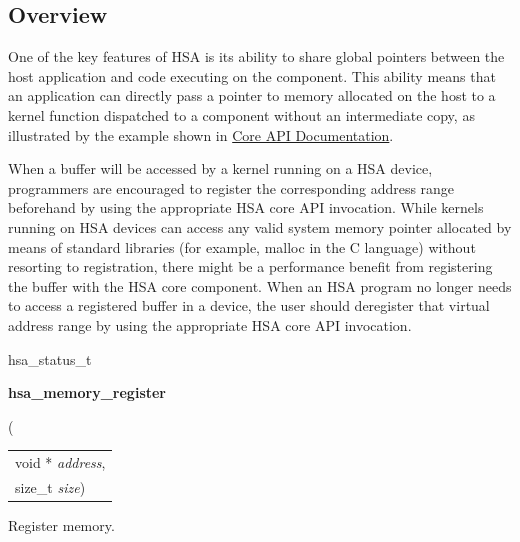 \documentclass{book}
\newcommand{\hsaarg}[1]{\textit{#1}}
\newcommand{\hsadef}[2]{\hypertarget{#1}{\textbf{#2}}}
\newcommand{\hsatyp}[2]{\hypertarget{#1}{#2}}
\begin{document}
\hypertarget{coreapi_registration_overview}{}\subsection{Overview}\label{coreapi_registration_overview}
One of the key features of HSA is its ability to share global
pointers between the host application and code executing on the
component. This ability means that an application can directly pass a
pointer to memory allocated on the host to a kernel function
dispatched to a component without an intermediate copy, as illustrated
by the example shown in \hyperlink{coreapi}{Core API
Documentation}.

When a buffer will be accessed by a kernel running on a HSA
device, programmers are encouraged to register the corresponding
address range beforehand by using the appropriate HSA core
API invocation. While kernels running on HSA devices can
access any valid system memory pointer allocated by means of
standard libraries (for example, malloc in the C language) without
resorting to registration, there might be a performance benefit from
registering the buffer with the HSA core component. When an
HSA program no longer needs to access a registered buffer in a
device, the user should deregister that virtual address range by
using the appropriate HSA core API invocation.

\makeatletter{}

\noindent\begin{tcolorbox}[breakable,nobeforeafter,colframe=white,colback=lightgray,left=0mm]
\hsatyp{group__status_1gad755322e7ff95456520e8abdbe90d225}{hsa\_status\_t} \hsadef{group__register_1ga13131274af7b6c583b689eaaca3e21f0}{hsa\_memory\_register}(
\vspace{-3.5mm}\begin{longtable}{@{}p{\textwidth}}
\hspace{1.7em}void * \hsaarg{address},\\
\hspace{1.7em}size\_t \hsaarg{size})\end{longtable}

\end{tcolorbox}
Register memory.
\end{document}
